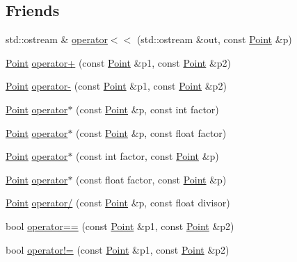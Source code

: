 \subsection*{Friends}
\begin{DoxyCompactItemize}
\item 
std\+::ostream \& \hyperlink{classprism_1_1_point_aa818efa680e0d94ce91173ccb4b7aa08}{operator$<$$<$} (std\+::ostream \&out, const \hyperlink{classprism_1_1_point}{Point} \&p)
\item 
\hyperlink{classprism_1_1_point}{Point} \hyperlink{classprism_1_1_point_af9fd2d27c54f694ce11ba1e9df0b58f1}{operator+} (const \hyperlink{classprism_1_1_point}{Point} \&p1, const \hyperlink{classprism_1_1_point}{Point} \&p2)
\item 
\hyperlink{classprism_1_1_point}{Point} \hyperlink{classprism_1_1_point_aff59dfb837229858286c1652bd9a8e40}{operator-\/} (const \hyperlink{classprism_1_1_point}{Point} \&p1, const \hyperlink{classprism_1_1_point}{Point} \&p2)
\item 
\hyperlink{classprism_1_1_point}{Point} \hyperlink{classprism_1_1_point_a3fff687aebd2165ff57e237363953f36}{operator$\ast$} (const \hyperlink{classprism_1_1_point}{Point} \&p, const int factor)
\item 
\hyperlink{classprism_1_1_point}{Point} \hyperlink{classprism_1_1_point_a6a69d67bbbf8aa38b38c71440a8341cc}{operator$\ast$} (const \hyperlink{classprism_1_1_point}{Point} \&p, const float factor)
\item 
\hyperlink{classprism_1_1_point}{Point} \hyperlink{classprism_1_1_point_ab4cfccba8d1b3c1d29dedb1d729ecaaf}{operator$\ast$} (const int factor, const \hyperlink{classprism_1_1_point}{Point} \&p)
\item 
\hyperlink{classprism_1_1_point}{Point} \hyperlink{classprism_1_1_point_a3141285de569d8565c2ae20e3155de14}{operator$\ast$} (const float factor, const \hyperlink{classprism_1_1_point}{Point} \&p)
\item 
\hyperlink{classprism_1_1_point}{Point} \hyperlink{classprism_1_1_point_adeafa81d7b8a890cbe28b9159aad4eb4}{operator/} (const \hyperlink{classprism_1_1_point}{Point} \&p, const float divisor)
\item 
bool \hyperlink{classprism_1_1_point_a2c5b474dd81e3ce9b80b206ea32deaae}{operator==} (const \hyperlink{classprism_1_1_point}{Point} \&p1, const \hyperlink{classprism_1_1_point}{Point} \&p2)
\item 
bool \hyperlink{classprism_1_1_point_a694df69725e33fcd64fd0942c6bb5e82}{operator!=} (const \hyperlink{classprism_1_1_point}{Point} \&p1, const \hyperlink{classprism_1_1_point}{Point} \&p2)
\end{DoxyCompactItemize}


